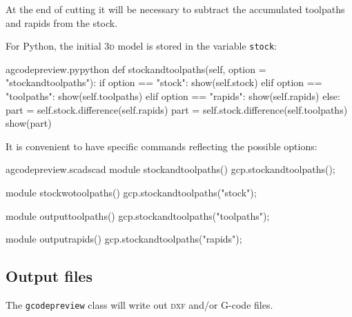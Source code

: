 \documentclass{ltxdoc}
\begin{document}
At the end of cutting it will be necessary to subtract the accumulated toolpaths and rapids from the stock. %

For Python, the initial \textsc{3d} model is stored in the variable \verb|stock|:

\lstset{firstnumber=\thegcpy}
\begin{writecode}{a}{gcodepreview.py}{python}
    def stockandtoolpaths(self, option = "stockandtoolpaths"):
        if option == "stock":
            show(self.stock)
        elif option == "toolpaths":
            show(self.toolpaths)
        elif option == "rapids":
            show(self.rapids)
        else:
            part = self.stock.difference(self.rapids)
            part = self.stock.difference(self.toolpaths)
            show(part)

\end{writecode}
\addtocounter{gcpy}{23}

It is convenient to have specific commands reflecting the possible options:

\lstset{firstnumber=\thegcpscad}
\begin{writecode}{a}{gcodepreview.scad}{scad}
module stockandtoolpaths(){
    gcp.stockandtoolpaths();
}

module stockwotoolpaths(){
    gcp.stockandtoolpaths("stock");
}

module outputtoolpaths(){
    gcp.stockandtoolpaths("toolpaths");
}

module outputrapids(){
    gcp.stockandtoolpaths("rapids");
}

\end{writecode}
\addtocounter{gcpscad}{16}

\subsection{Output files}

The \verb|gcodepreview| class will write out \textsc{dxf} and/or G-code files.

\end{document}
